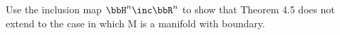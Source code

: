 Use the inclusion map $\bbH^n  \inc \bbR^n$ to show that Theorem 4.5 does not extend to the case in which M is a manifold with boundary.